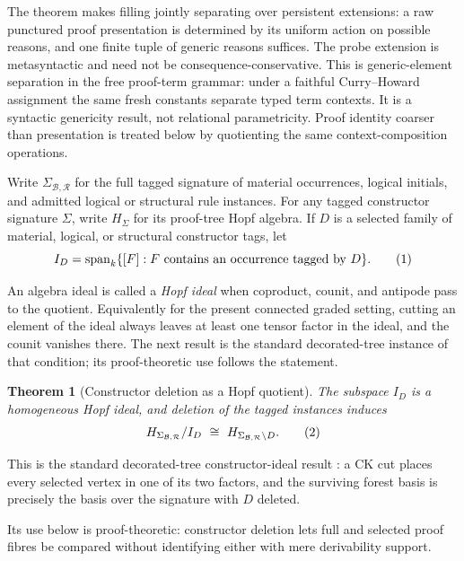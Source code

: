 \documentclass[10pt,a4paper]{article}
\theoremstyle{plain}
\newtheorem{theorem}{Theorem}[section]
\theoremstyle{definition}
\theoremstyle{remark}
\newcommand{\Base}{\mathcal B}
\newcommand{\Rules}{\mathcal R}
\newcommand{\eqtag}{\refstepcounter{equation}\tag{\theequation}}
\begin{document}
The theorem makes filling jointly separating over persistent extensions:
a raw punctured proof presentation is determined by its uniform action on
possible reasons, and one finite tuple of generic reasons suffices.  The
probe extension is metasyntactic and need not be consequence-conservative.
This is generic-element separation in the free proof-term grammar: under
a faithful Curry--Howard assignment the same fresh constants separate
typed term contexts.  It is a syntactic genericity result, not relational
parametricity.
Proof identity coarser than presentation is treated below by quotienting
the same context-composition operations.

Write \(\Sigma_{\Base,\Rules}\) for the full tagged signature of material
occurrences, logical initials, and admitted logical or structural rule
instances.  For any tagged constructor signature \(\Sigma\), write
\(H_\Sigma\) for its proof-tree Hopf algebra.  If \(D\) is a selected
family of material, logical, or structural constructor tags, let
\[
 I_D=\operatorname{span}_k\{[F]:F\text{ contains an occurrence tagged by }D\}.
\eqtag\label{eq:constructor-deletion-ideal}
\]

An algebra ideal is called a \emph{Hopf ideal} when coproduct, counit, and
antipode pass to the quotient.  Equivalently for the present connected
graded setting, cutting an element of the ideal always leaves at least one
tensor factor in the ideal, and the counit vanishes there.  The next result
is the standard decorated-tree instance of that condition; its
proof-theoretic use follows the statement.

\begin{theorem}[Constructor deletion as a Hopf quotient]
\label{thm:constructor-deletion}
The subspace \(I_D\) is a homogeneous Hopf ideal, and deletion of the
tagged instances induces
\[
 H_{\Sigma_{\Base,\Rules}}/I_D
   \ \cong\
 H_{\Sigma_{\Base,\Rules}\setminus D}.
\eqtag\label{eq:constructor-deletion-hopf-quotient}
\]
\end{theorem}

This is the standard decorated-tree constructor-ideal result
\cite{foissy2002,foissy2021typed}: a CK cut places every selected vertex
in one of its two factors, and the surviving forest basis is precisely
the basis over the signature with \(D\) deleted.

Its use below is proof-theoretic: constructor deletion lets full and
selected proof fibres be compared without identifying either with mere
derivability support.
\end{document}
